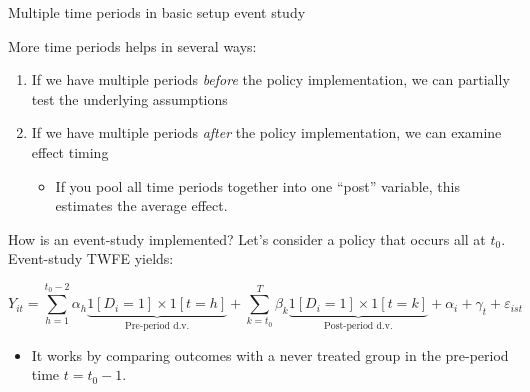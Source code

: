\documentclass[notes,11pt, aspectratio=169]{beamer}
\newenvironment{wideitemize}{\itemize\addtolength{\itemsep}{10pt}}{\enditemize}
\begin{document}
\begin{frame}{Multiple time periods in basic setup event study}
  \begin{wideitemize}
  \item  More time periods helps in several ways:
  \end{wideitemize}
  
\begin{enumerate}[1]
    \item If we have multiple periods \emph{before} the policy implementation, we can partially test the underlying assumptions
    \item If we have multiple periods \emph{after} the policy implementation, we can examine effect timing
      \begin{itemize}
    
      \item If you pool all time periods together into one ``post'' variable, this estimates the average effect.
      \end{itemize}
    \end{enumerate}
   \begin{wideitemize}
  \item  How is an event-study implemented? Let's consider a policy that occurs all at $t_{0}$. Event-study TWFE yields:
   \end{wideitemize} 
  
\begin{equation*}
Y_{it}=\sum_{h=1}^{t_0-2}\alpha_h \underbrace{1\left[D_i=1\right]\times 1\left[t=h\right]}_{\text{Pre-period d.v.} }+\sum_{k=t_0}^{T}\beta_k \underbrace{1\left[D_i=1\right]\times 1\left[t=k\right]}_{\text{Post-period d.v.}}+\alpha_i+\gamma_t+\varepsilon_{ist}
\end{equation*}
    \begin{itemize}
      \item It works by comparing outcomes with a never treated group in the pre-period time $t=t_0-1$.
      \end{itemize}
  \end{frame}
\end{document}
